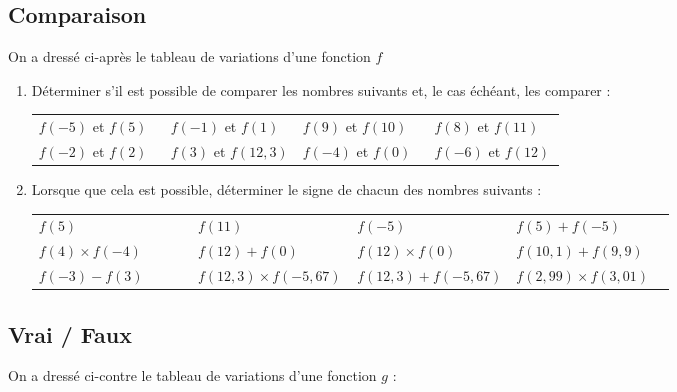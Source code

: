 \documentclass[oneside,12pt]{article}          %
\begin{document}
\subsection{Comparaison}
On a dressé ci-après le tableau de variations d'une fonction $f$

\begin{enumerate}
	\item Déterminer s'il est possible de comparer les nombres suivants et, le cas échéant, les comparer :
	
	\renewcommand{\arraystretch}{1.5}\hspace{-15mm}
	\begin{tabular}{P{0.25\linewidth} P{0.25\linewidth} P{0.25\linewidth} P{0.25\linewidth}}
		$f(-5)$ et $f(5)$ & $f(-1)$ et $f(1)$ & $f(9)$ et $f(10)$ & $f(8)$ et $f(11)$ \\
		$f(-2)$ et $f(2)$ & $f(3)$ et $f(12,3)$ & $f(-4)$ et $f(0)$ & $f(-6)$ et $f(12)$
	\end{tabular}
	
	\item Lorsque que cela est possible, déterminer le signe de chacun des nombres suivants :
	
	\renewcommand{\arraystretch}{1.5}\hspace{-15mm}
	\begin{tabular}{P{0.25\linewidth} P{0.25\linewidth} P{0.25\linewidth} P{0.25\linewidth}}
		$f(5)$ & $f(11)$ & $f(-5)$ & $f(5)+f(-5)$ \\
		$f(4)\times f(-4)$ & $f(12)+f(0)$ & $f(12)\times f(0)$ & $f(10,1)+f(9,9)$ \\
		$f(-3)-f(3)$ & $f(12,3)\times f(-5,67)$ & $f(12,3)+f(-5,67)$ & $f(2,99)\times f(3,01)$
	\end{tabular}
\end{enumerate}



\subsection{Vrai / Faux}
On a dressé ci-contre le tableau de variations d'une fonction $g$ :

\end{document}

